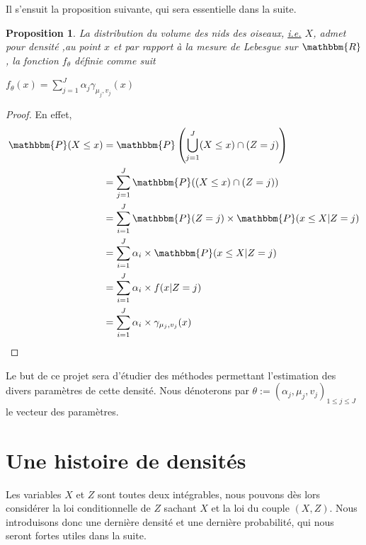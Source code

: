 \documentclass[frenchb]{report}
\newcommand{\R}{\mathbbm{R}}
\newcommand{\1}{\mathbbm{1}}
\newcommand{\prob}{\mathbbm{P}}
\newtheorem{prop}{Proposition}
\theoremstyle{definition}\newtheorem{defn}{Définition}
\theoremstyle{definition}\newtheorem{exm}{Exemple}
\theoremstyle{definition}\newtheorem{nota}{Notation}
\theoremstyle{definition}\newtheorem{rem}{Remarque}
\begin{document}
Il s'ensuit la proposition suivante, qui sera essentielle dans la suite.
\begin{prop}
La distribution du volume des nids des oiseaux, \underline{i.e.} $X$, admet pour densité ,au point $x$ et par rapport à la mesure de Lebesgue sur $\R$, la fonction $f_ \theta$ définie comme suit
\begin{center} $f_\theta(x) = \displaystyle\sum_{j=1}^J \alpha_j \gamma_{\mu_j, v_j}(x) $ \end{center}
\end{prop}

\begin{proof}
En effet, 
\begin{align*}
\prob(X\leq x) &= \prob\left(\bigcup_{j=1}^J (X\leq x)\cap(Z=j)\right)\\
&=\displaystyle\sum_{j=1}^J \prob((X\leq x)\cap(Z=j))\\
&=\displaystyle\sum_{i=1}^J\prob(Z=j)\times\prob(x\leq X | Z = j) \\
&=\displaystyle\sum_{i=1}^J\alpha_i\times\prob(x\leq X | Z = j) \\
&=\displaystyle\sum_{i=1}^J\alpha_i\times f(x| Z = j) \\
&= \displaystyle\sum_{i=1}^J\alpha_i\times \gamma_{\mu_j, v_j}(x)
\end{align*}

\end{proof}

Le but de ce projet sera d'étudier des méthodes permettant l'estimation des divers paramètres de cette densité. Nous dénoterons par $\theta := (\alpha_j, \mu_j, v_j)_{1\leq j\leq J}$ le vecteur des paramètres.

\section{Une histoire de densités}
Les variables $X$ et $Z$ sont toutes deux intégrables, nous pouvons dès lors considérer la loi conditionnelle de $Z$ sachant $X$ et la loi du couple $(X,Z)$. Nous introduisons donc une dernière densité et une dernière probabilité, qui nous seront fortes utiles dans la suite. 
\end{document}
